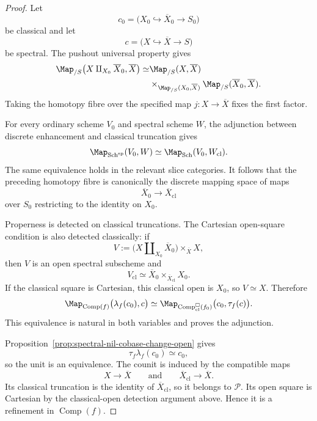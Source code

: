 \begin{proof}
Let
\[
    c_0=
    \bigl(
      X_0\hookrightarrow\overline X_0\to S_0
    \bigr)
\]
be classical and let
\[
    c=
    \bigl(
      X\hookrightarrow\overline X\to S
    \bigr)
\]
be spectral.  The pushout universal property gives
\[
\begin{aligned}
    \Map_{/S}
    \bigl(
      X\amalg_{X_0}\overline X_0,
      \overline X
    \bigr)
    \simeq
    &\Map_{/S}(X,\overline X) \\
    &\times_{\Map_{/S}(X_0,\overline X)}
    \Map_{/S}(\overline X_0,\overline X).
\end{aligned}
\]
Taking the homotopy fibre over the specified map
\(j:X\to\overline X\) fixes the first factor.

For every ordinary scheme \(V_0\) and spectral scheme \(W\), the adjunction
between discrete enhancement and classical truncation gives
\[
    \Map_{\operatorname{Sch}^{\mathrm{sp}}}(V_0,W)
    \simeq
    \Map_{\operatorname{Sch}}(V_0,W_{\mathrm{cl}}).
\]
The same equivalence holds in the relevant slice categories.  It follows
that the preceding homotopy fibre is canonically the discrete mapping space
of maps
\[
    \overline X_0
    \longrightarrow
    \overline X_{\mathrm{cl}}
\]
over \(S_0\) restricting to the identity on \(X_0\).

Properness is detected on classical truncations.  The Cartesian open-square
condition is also detected classically: if
\[
    V
    :=
    \bigl(
      X\amalg_{X_0}\overline X_0
    \bigr)
    \times_{\overline X}X,
\]
then \(V\) is an open spectral subscheme and
\[
    V_{\mathrm{cl}}
    \simeq
    \overline X_0
    \times_{\overline X_{\mathrm{cl}}}
    X_0.
\]
If the classical square is Cartesian, this classical open is \(X_0\), so
\(V\simeq X\).  Therefore
\[
    \Map_{\operatorname{Comp}(f)}
    \bigl(
      \lambda_f(c_0),c
    \bigr)
    \simeq
    \Map_{\operatorname{Comp}^{\square}_{\mathrm{cl}}(f_0)}
    \bigl(
      c_0,\tau_f(c)
    \bigr).
\]
This equivalence is natural in both variables and proves the adjunction.

Proposition~\ref{prop:spectral-nil-cobase-change-open} gives
\[
    \tau_f\lambda_f(c_0)
    \simeq
    c_0,
\]
so the unit is an equivalence.  The counit is induced by the compatible maps
\[
    X\longrightarrow\overline X
    \qquad\text{and}\qquad
    \overline X_{\mathrm{cl}}
    \longrightarrow
    \overline X.
\]
Its classical truncation is the identity of
\(\overline X_{\mathrm{cl}}\), so it belongs to \(\mathcal P\).  Its open
square is Cartesian by the classical-open detection argument above.  Hence
it is a refinement in \(\operatorname{Comp}(f)\).
\end{proof}

